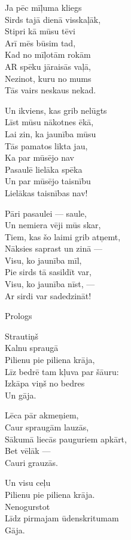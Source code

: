 \documentclass[14pt]{extarticle}
\begin{document}
{{Ja pēc mīļuma kliegs\\
Sirds tajā dienā visskaļāk,\\
Stipri kā mūsu tēvi\\
Arī mēs būsim tad,\\
Kad no mīļotām rokām\\
AR spēku jāraisās vaļā,\\
Nezinot, kuru no mums\\
Tās vairs neskaus nekad.

Un ikviens, kas grib nelūgts\\
Līst mūsu nākotnes ēkā,\\
Lai zin, ka jaunība mūsu\\
Tās pamatos likta jau,\\
Ka par mūsējo nav\\
Pasaulē lielāka spēka\\
Un par mūsējo taisnību\\
Lielākas taisnības nav!

Pāri pasaulei --- saule,\\
Un nemiera vēji mūs skar,\\
Tiem, kas šo laimi grib atņemt,\\
Nāksies saprast un zinā ---\\
Visu, ko jaunība mīl,\\
Pie sirds tā sasildīt var,\\
Visu, ko jaunība nīst, ---\\
Ar sirdi var sadedzināt!



\newpage

{\large \sc Prologs}

Strautiņš\\
Kalnu spraugā\\
Pilienu pie piliena krāja,\\
Līz bedrē tam kļuva par šāuru:\\
Izkāpa viņš no bedres\\
Un gāja. 

Lēca pār akmeņiem,\\
Caur spraugām lauzās,\\
Sākumā liecās pauguriem apkārt,\\
Bet vēlāk ---\\
Cauri grauzās. 

Un visu ceļu\\
Pilienu pie piliena krāja.\\
Nenogurstot\\
Līdz pirmajam ūdenskritumam\\
Gāja. 

}}
\end{document}
